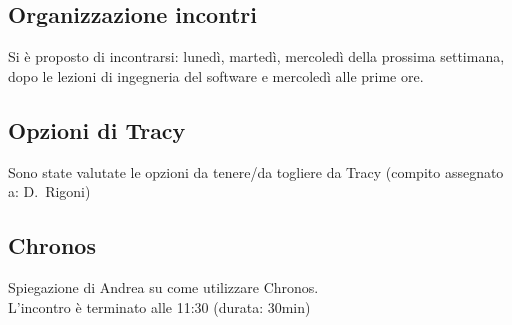 \documentclass[11pt]{meetingmins}
\begin{document}
\subsection{Organizzazione incontri}

Si \`{e} proposto di incontrarsi: luned\`{i}, marted\`{i}, mercoled\`{i} della prossima settimana, dopo le lezioni di ingegneria del software e mercoled\`{i} alle prime ore.\\

\subsection{Opzioni di Tracy}

Sono state valutate le opzioni da tenere/da togliere da Tracy (compito assegnato a: D.~Rigoni)

\subsection{Chronos}

Spiegazione di Andrea su come utilizzare Chronos.\\

L'incontro è terminato alle 11:30 (durata: 30min)\\

\end{document}
